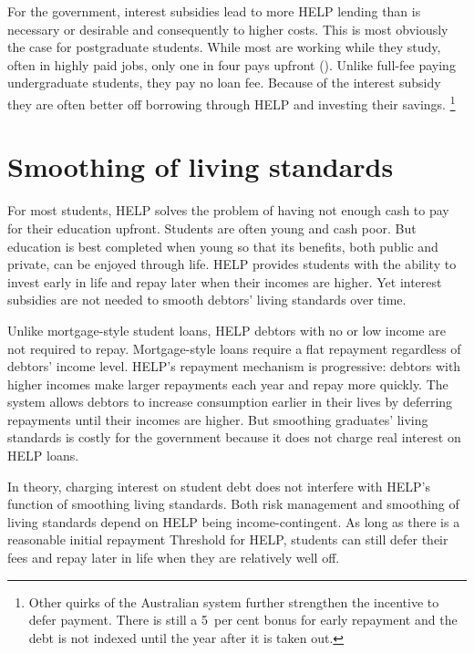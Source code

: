\documentclass{grattan}
\begin{document}
For the government, interest subsidies lead to more \gls{HELP} lending than is necessary or desirable and consequently to higher costs.
This is most obviously the case for postgraduate students.
While most are working while they study, often in highly paid jobs, only one in four pays upfront ().
Unlike full-fee paying undergraduate students, they pay no loan fee.
Because of the interest subsidy they are often better off borrowing through \gls{HELP} and investing their savings.%
   \footnote{Other quirks of the Australian system further strengthen the incentive to defer payment.
There is still a 5~per cent bonus for early repayment and the debt is not indexed until the year after it is taken out.}

\section{Smoothing of living standards}\label{smoothing-of-living-standards}

For most students, \gls{HELP} solves the problem of having not enough cash to pay for their education upfront.
Students are often young and cash poor.
But education is best completed when young so that its benefits, both public and private, can be enjoyed through life.
\gls{HELP} provides students with the ability to invest early in life and repay later when their incomes are higher. Yet interest subsidies are not needed to smooth debtors' living standards over time.

Unlike mortgage-style student loans, \gls{HELP} debtors with no or low income are not required to repay.
Mortgage-style loans require a flat repayment regardless of debtors' income level.
\gls{HELP}'s repayment mechanism is progressive: debtors with higher incomes make larger repayments each year and repay more quickly.
The system allows debtors to increase consumption earlier in their lives by deferring repayments until their incomes are higher.
But smoothing graduates' living standards is costly for the government because it does not charge real interest on \gls{HELP} loans.

In theory, charging interest on student debt does not interfere with \gls{HELP}'s function of smoothing living standards. Both risk management and smoothing of living standards depend on \gls{HELP} being income-contingent.
As long as there is a reasonable initial repayment \gls{Threshold} for \gls{HELP}, students can still defer their fees and repay later in life when they are relatively well off.
\end{document}
